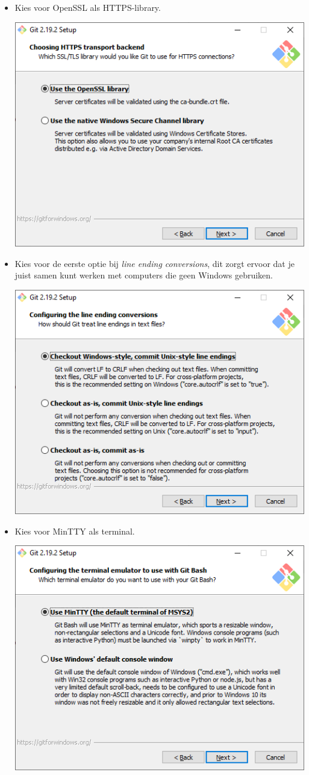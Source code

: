\documentclass[a4paper]{extarticle}
\begin{document}
\begin{itemize}
	\item Kies voor OpenSSL als HTTPS-library.
		\begin{center}
			\includegraphics[width=0.75\linewidth]{windows-screenshots/4}
		\end{center}

		\clearpage

	\item Kies voor de eerste optie bij \textit{line ending conversions}, dit zorgt ervoor dat je juist samen kunt
		werken met computers die geen Windows gebruiken.

		\begin{center}
			\includegraphics[width=0.75\linewidth]{windows-screenshots/5}
		\end{center}

	\item Kies voor MinTTY als terminal.
		\begin{center}
			\includegraphics[width=0.75\linewidth]{windows-screenshots/6}
		\end{center}


\end{itemize}
\end{document}
